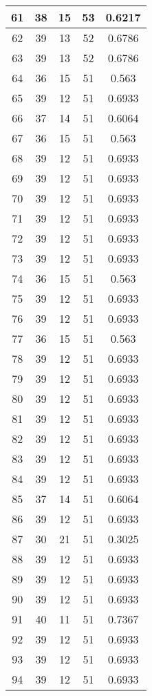 \documentclass[letterpaper, 12pt]{article}
\begin{document}
\begin{longtable}{|c|c|c|c|c|}
\hline
61 & 38 & 15 & 53 & 0.6217 \\
\hline
62 & 39 & 13 & 52 & 0.6786 \\
\hline
63 & 39 & 13 & 52 & 0.6786 \\
\hline
64 & 36 & 15 & 51 & 0.563 \\
\hline
65 & 39 & 12 & 51 & 0.6933 \\
\hline
66 & 37 & 14 & 51 & 0.6064 \\
\hline
67 & 36 & 15 & 51 & 0.563 \\
\hline
68 & 39 & 12 & 51 & 0.6933 \\
\hline
69 & 39 & 12 & 51 & 0.6933 \\
\hline
70 & 39 & 12 & 51 & 0.6933 \\
\hline
71 & 39 & 12 & 51 & 0.6933 \\
\hline
72 & 39 & 12 & 51 & 0.6933 \\
\hline
73 & 39 & 12 & 51 & 0.6933 \\
\hline
74 & 36 & 15 & 51 & 0.563 \\
\hline
75 & 39 & 12 & 51 & 0.6933 \\
\hline
76 & 39 & 12 & 51 & 0.6933 \\
\hline
77 & 36 & 15 & 51 & 0.563 \\
\hline
78 & 39 & 12 & 51 & 0.6933 \\
\hline
79 & 39 & 12 & 51 & 0.6933 \\
\hline
80 & 39 & 12 & 51 & 0.6933 \\
\hline
81 & 39 & 12 & 51 & 0.6933 \\
\hline
82 & 39 & 12 & 51 & 0.6933 \\
\hline
83 & 39 & 12 & 51 & 0.6933 \\
\hline
84 & 39 & 12 & 51 & 0.6933 \\
\hline
85 & 37 & 14 & 51 & 0.6064 \\
\hline
86 & 39 & 12 & 51 & 0.6933 \\
\hline
87 & 30 & 21 & 51 & 0.3025 \\
\hline
88 & 39 & 12 & 51 & 0.6933 \\
\hline
89 & 39 & 12 & 51 & 0.6933 \\
\hline
90 & 39 & 12 & 51 & 0.6933 \\
\hline
91 & 40 & 11 & 51 & 0.7367 \\
\hline
92 & 39 & 12 & 51 & 0.6933 \\
\hline
93 & 39 & 12 & 51 & 0.6933 \\
\hline
94 & 39 & 12 & 51 & 0.6933 \\

\end{longtable}
\end{document}
